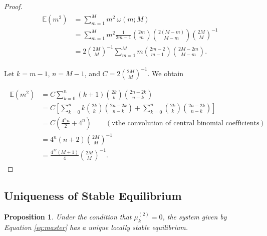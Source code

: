 \documentclass[11pt, class=article, crop=false]{standalone}
\newtheorem{proposition}{Proposition}[subsection]
\theoremstyle{definition}
\begin{document}
\begin{proof}

\begin{align}
    \begin{split}
    \mathbb{E}(m^2) 
    &= \sum_{m = 1}^M m^2~\omega(m; M) \\
    &= \sum_{m = 1}^M m^2 \frac{1}{2m - 1} \binom{2m}{m} \binom{2(M - m)}{M - m} \binom{2M}{M}^{-1}\\
    &= 2 \binom{2M}{M}^{-1} \sum_{m = 1}^M m \binom{2m - 2}{m - 1} \binom{2M-2m}{M-m}.
    \end{split}
\end{align}

Let $k = m-1$, $n = M-1$, and $C = 2 \binom{2M}{M}^{-1}$. 
We obtain

\begin{align}
    \begin{split}
    \mathbb{E}(m^2) 
    &= C \sum_{k=0}^n (k + 1) \binom{2k}{k} \binom{2n - 2k}{n - k} \\
    &= C \left[\sum_{k=0}^n k \binom{2k}{k} \binom{2n - 2k}{n - k} + \sum_{k=0}^n \binom{2k}{k} \binom{2n - 2k}{n - k}\right]\\
    & = C(\frac{4^nn}{2} + 4^n) \qquad (\because \text{the convolution of central binomial coefficients})\\
    &= 4^n (n + 2) {\binom{2M}{M}}^{-1}\\
    &= \frac{4^M (M + 1)}{4} {\binom{2M}{M}}^{-1}.
    \end{split}
\end{align}

\end{proof}

\newpage

\subsection{Uniqueness of Stable Equilibrium}
 
\begin{proposition}
Under the condition that $\mu_k^{(2)} = 0$, the system given by Equation \ref{eq:master} has a unique locally stable equilibrium.
\end{proposition}
\end{document}
